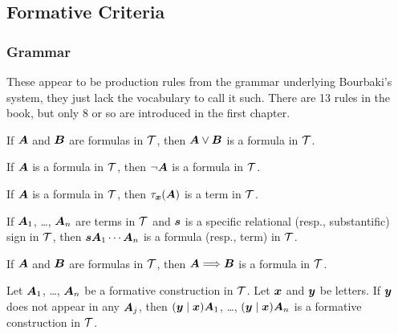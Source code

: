 \subsection{Formative Criteria}

\subsubsection{Grammar}
These appear to be production rules from the grammar underlying
Bourbaki's system, they just lack the vocabulary to call it such. There
are 13 rules in the book, but only 8 or so are introduced in the first
chapter. 

\begin{cf}\label{cf1}
If $\boldsymbol{A}$ and $\boldsymbol{B}$ are formulas in
$\mathcal{T}$, then $\boldsymbol{A}\lor\boldsymbol{B}$ is a formula
in $\mathcal{T}$.
\end{cf}

\begin{cf}\label{cf2}
If $\boldsymbol{A}$ is a formula in $\mathcal{T}$, then
$\neg\boldsymbol{A}$ is a formula in $\mathcal{T}$.
\end{cf} 

\begin{cf}\label{cf3}
If $\boldsymbol{A}$ is a formula in $\mathcal{T}$, then
$\tau_{\boldsymbol{x}}(\boldsymbol{A})$ is a term in $\mathcal{T}$.
\end{cf}

\begin{cf}\label{cf4}
If $\boldsymbol{A}_{1}$, \dots, $\boldsymbol{A}_{n}$ are terms in
$\mathcal{T}$ and $\boldsymbol{s}$ is a specific relational (resp.,
substantific) sign in $\mathcal{T}$, then
$\boldsymbol{s}\boldsymbol{A}_{1}\cdots\boldsymbol{A}_{n}$ is a
formula (resp., term) in $\mathcal{T}$.
\end{cf} 

\begin{cf}\label{cf5}
If $\boldsymbol{A}$ and $\boldsymbol{B}$ are formulas in
$\mathcal{T}$, then $\boldsymbol{A}\Longrightarrow\boldsymbol{B}$ is a
formula in $\mathcal{T}$.
\end{cf}

\begin{cf}\label{cf6}
Let $\boldsymbol{A}_{1}$, \dots, $\boldsymbol{A}_{n}$ be a formative
construction in $\mathcal{T}$. Let $\boldsymbol{x}$ and
$\boldsymbol{y}$ be letters. If $\boldsymbol{y}$ does not appear in
any $\boldsymbol{A}_{j}$, then
$(\boldsymbol{y}\mid\boldsymbol{x})\boldsymbol{A}_{1}$, \dots,
$(\boldsymbol{y}\mid\boldsymbol{x})\boldsymbol{A}_{n}$ is a
formative construction in $\mathcal{T}$.
\end{cf} 

